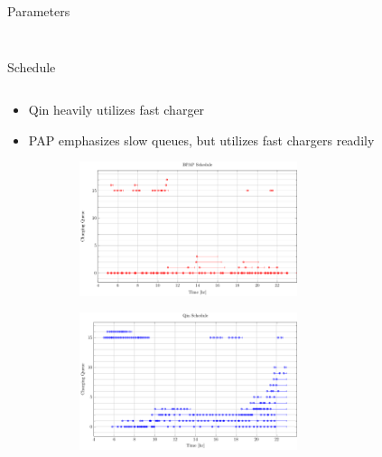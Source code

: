 \documentclass[aspectratio=169]{beamer}
\begin{document}
\begin{frame}[label={sec:orgf864280}]{Parameters}
\begin{columns}
\begin{column}{0.5\columnwidth}
\begin{figure}
{
      }
      \label{fig:spacial-and-temporal-constr}
\end{figure}
\end{column}
\end{columns}
\end{frame}

\begin{frame}[label={sec:org352f467}]{Schedule}
\begin{columns}
\begin{column}{0.5\columnwidth}
{\scriptsize
\begin{itemize}
\item Qin heavily utilizes fast charger
\item PAP emphasizes slow queues, but utilizes fast chargers readily
\end{itemize}
}

\begin{figure}
\begin{subfigure}[t]{\textwidth}
\centering
    \includegraphics[width=0.7\textwidth]{img/sa-pap-paper-good/schedule-milp}
\end{subfigure}
\begin{subfigure}[t]{\textwidth}
\centering
    \includegraphics[width=0.7\textwidth]{img/sa-pap-paper-good/schedule-qin}
\end{subfigure}
\end{figure}
\end{column}


\end{columns}
\end{frame}
\end{document}
